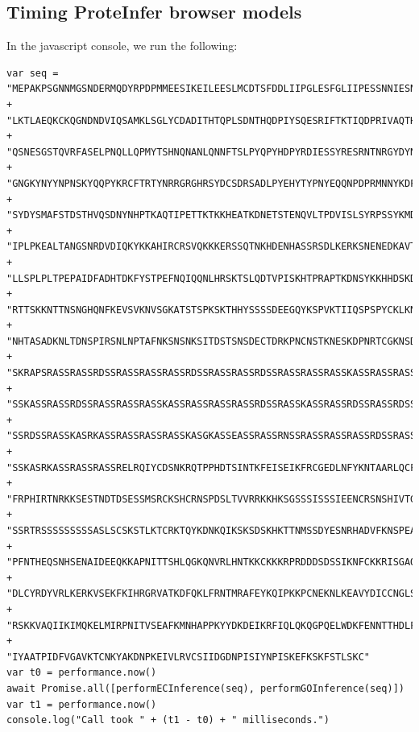 \subsection{Timing ProteInfer browser models}
\label{sup:js_timing}
In the javascript console, we run the following:
\begin{verbatim}
var seq = "MEPAKPSGNNMGSNDERMQDYRPDPMMEESIKEILEESLMCDTSFDDLIIPGLESFGLIIPESSNNIESNNVEEGSDGE" +
"LKTLAEQKCKQGNDNDVIQSAMKLSGLYCDADITHTQPLSDNTHQDPIYSQESRIFTKTIQDPRIVAQTHRQCTSSASNL" + 
"QSNESGSTQVRFASELPNQLLQPMYTSHNQNANLQNNFTSLPYQPYHDPYRDIESSYRESRNTNRGYDYNFRHHPYRPRG" + 
"GNGKYNYYNPNSKYQQPYKRCFTRTYNRRGRGHRSYDCSDRSADLPYEHYTYPNYEQQNPDPRMNNYKDFTQLTNKFNFE" + 
"SYDYSMAFSTDSTHVQSDNYNHPTKAQTIPETTKTKKHEATKDNETSTENQVLTPDVISLSYRPSSYKMDIIKKIYDTDV" + 
"IPLPKEALTANGSNRDVDIQKYKKAHIRCRSVQKKKERSSQTNKHDENHASSRSDLKERKSNENEDKAVTKARDFSKLNP" + 
"LLSPLPLTPEPAIDFADHTDKFYSTPEFNQIQQNLHRSKTSLQDTVPISKHTPRAPTKDNSYKKHHDSKDNYPKMKHSPG" + 
"RTTSKKNTTNSNGHQNFKEVSVKNVSGKATSTSPKSKTHHYSSSSDEEGQYKSPVKTIIQSPSPYCKLKNPSIMDKNSAK" + 
"NHTASADKNLTDNSPIRSNLNPTAFNKSNSNKSITDSTSNSDECTDRKPNCNSTKNESKDPNRTCGKNSDKHLSKSCTMA" + 
"SKRAPSRASSRASSRDSSRASSRASSRASSRDSSRASSRASSRDSSRASSRASSRASSKASSRASSRASSRASSRDSSRA" + 
"SSKASSRASSRDSSRASSRASSRASSKASSRASSRASSRASSRDSSRASSKASSRASSRDSSRASSRDSSRDSSRASSRA" + 
"SSRDSSRASSKASRKASSRASSRASSRASSKASGKASSEASSRASSRNSSRASSRASSRASSRDSSRASSRASSRDSSRA" + 
"SSKASRKASSRASSRASSRELRQIYCDSNKRQTPPHDTSINTKFEISEIKFRCGEDLNFYKNTAARLQCFNHNDQFYNPR" + 
"FRPHIRTNRKKSESTNDTDSESSMSRCKSHCRNSPDSLTVVRRKKHKSGSSSISSSIEENCRSNSHIVTGKEKFTPFYYQ" + 
"SSRTRSSSSSSSSSASLSCSKSTLKTCRKTQYKDNKQIKSKSDSKHKTTNMSSDYESNRHADVFKNSPEAGEKFPLHNSS" + 
"PFNTHEQSNHSENAIDEEQKKAPNITTSHLQGKQNVRLHNTKKCKKKRPRDDDSDSSIKNFCKKRISGAQKTESEVSEPD" + 
"DLCYRDYVRLKERKVSEKFKIHRGRVATKDFQKLFRNTMRAFEYKQIPKKPCNEKNLKEAVYDICCNGLSNNAAIIMYFT" + 
"RSKKVAQIIKIMQKELMIRPNITVSEAFKMNHAPPKYYDKDEIKRFIQLQKQGPQELWDKFENNTTHDLFTRHSDVKTMI" + 
"IYAATPIDFVGAVKTCNKYAKDNPKEIVLRVCSIIDGDNPISIYNPISKEFKSKFSTLSKC"
var t0 = performance.now()
await Promise.all([performECInference(seq), performGOInference(seq)])
var t1 = performance.now()
console.log("Call took " + (t1 - t0) + " milliseconds.")
    
\end{verbatim}

%


